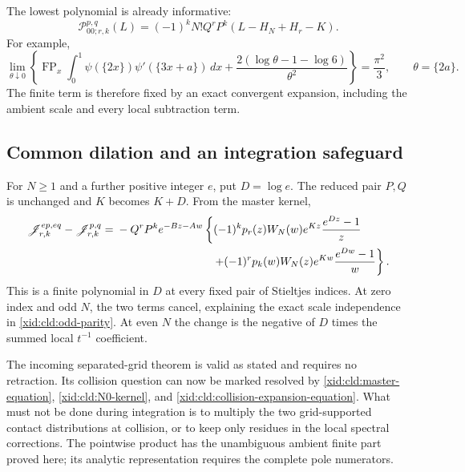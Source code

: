The lowest polynomial is already informative:
\begin{equation}
 \mathcal P_{00;r,k}^{p,q}(L)
    =(-1)^kN!Q^rP^k(L-H_N+H_r-K).
 \label{xid:cld:lowest-collision}
\end{equation}
For example,
\[
 \lim_{\theta\downarrow0}\left\{
 \operatorname{FP}_x\int_0^1
   \psi(\{2x\})\psi'(\{3x+a\})\,dx
     +\frac{2(\log\theta-1-\log6)}{\theta^2}\right\}
 =\frac{\pi^2}{3},\qquad \theta=\{2a\}.
\]
The finite term is therefore fixed by an exact convergent expansion,
including the ambient scale and every local subtraction term.

\subsection{Common dilation and an integration safeguard}

For $N\ge1$ and a further positive integer $e$, put $D=\log e$.  The reduced pair
$P,Q$ is unchanged and $K$ becomes $K+D$.  From the master kernel,
\begin{align}
 \mathscr J_{r,k}^{ep,eq}-\mathscr J_{r,k}^{p,q}
 ={}&-Q^rP^ke^{-Bz-Aw}
   \left\{(-1)^k p_r(z)W_N(w)e^{Kz}\frac{e^{Dz}-1}{z}\right.\notag\\
 &\hspace{30mm}\left.
        +(-1)^r p_k(w)W_N(z)e^{Kw}\frac{e^{Dw}-1}{w}\right\}.
 \label{xid:cld:common-scale}
\end{align}
This is a finite polynomial in $D$ at every fixed pair of Stieltjes
indices.  At zero index and odd $N$, the two terms cancel, explaining
the exact scale independence in \eqref{xid:cld:odd-parity}.  At even $N$ the
change is the negative of $D$ times the summed local $t^{-1}$ coefficient.

The incoming separated-grid theorem is valid as stated and requires no
retraction.  Its collision question can now be marked resolved by
\eqref{xid:cld:master-equation}, \eqref{xid:cld:N0-kernel}, and
\eqref{xid:cld:collision-expansion-equation}.  What must not be done during
integration is to multiply the two grid-supported contact distributions
at collision, or to keep only residues in the local spectral corrections.
The pointwise product has the unambiguous ambient finite part proved
here; its analytic representation requires the complete pole numerators.

